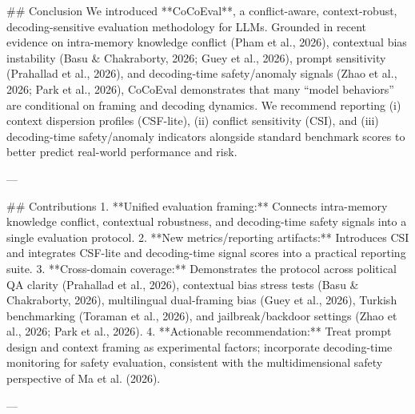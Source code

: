 ## Conclusion  
We introduced **CoCoEval**, a conflict-aware, context-robust, decoding-sensitive evaluation methodology for LLMs. Grounded in recent evidence on intra-memory knowledge conflict (Pham et al., 2026), contextual bias instability (Basu & Chakraborty, 2026; Guey et al., 2026), prompt sensitivity (Prahallad et al., 2026), and decoding-time safety/anomaly signals (Zhao et al., 2026; Park et al., 2026), CoCoEval demonstrates that many “model behaviors” are conditional on framing and decoding dynamics. We recommend reporting (i) context dispersion profiles (CSF-lite), (ii) conflict sensitivity (CSI), and (iii) decoding-time safety/anomaly indicators alongside standard benchmark scores to better predict real-world performance and risk.

---

## Contributions  
1. **Unified evaluation framing:** Connects intra-memory knowledge conflict, contextual robustness, and decoding-time safety signals into a single evaluation protocol.  
2. **New metrics/reporting artifacts:** Introduces CSI and integrates CSF-lite and decoding-time signal scores into a practical reporting suite.  
3. **Cross-domain coverage:** Demonstrates the protocol across political QA clarity (Prahallad et al., 2026), contextual bias stress tests (Basu & Chakraborty, 2026), multilingual dual-framing bias (Guey et al., 2026), Turkish benchmarking (Toraman et al., 2026), and jailbreak/backdoor settings (Zhao et al., 2026; Park et al., 2026).  
4. **Actionable recommendation:** Treat prompt design and context framing as experimental factors; incorporate decoding-time monitoring for safety evaluation, consistent with the multidimensional safety perspective of Ma et al. (2026).

---
